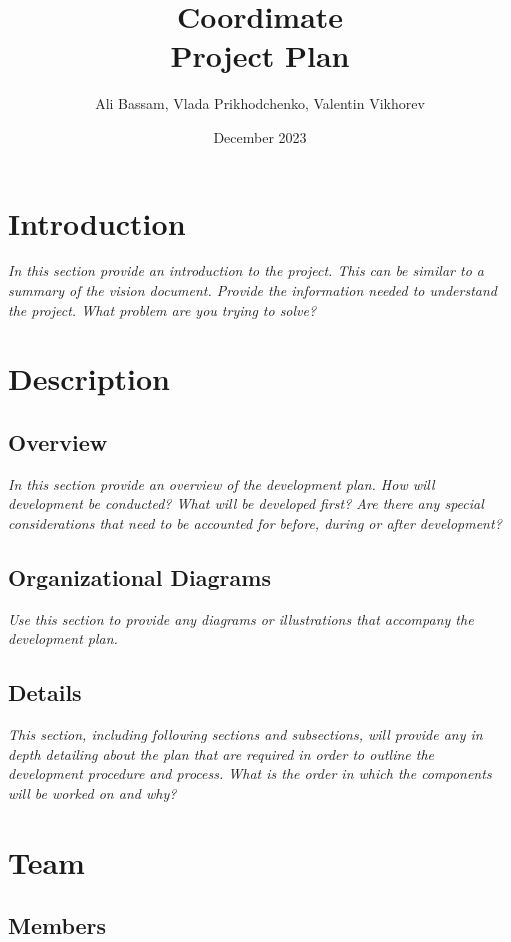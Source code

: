 \documentclass{article}
\title{Coordimate\\Project Plan}
\date{December 2023}
\author{Ali Bassam, Vlada Prikhodchenko, Valentin Vikhorev}
\begin{document}
\maketitle

\section{Introduction}

\textit{In this section provide an introduction to the project. This can be similar to
a summary of the vision document. Provide the information needed to understand
the project. What problem are you trying to solve?}

\section{Description}

\subsection{Overview}

\textit{In this section provide an overview of the development plan. How will
development be conducted? What will be developed first? Are there any special
considerations that need to be accounted for before, during or after
development?}

\subsection{Organizational Diagrams}

\textit{Use this section to provide any diagrams or illustrations that accompany the
development plan.}

\subsection{Details}

\textit{This section, including following sections and subsections, will provide any
in depth detailing about the plan that are required in order to outline the
development procedure and process. What is the order in which the components
will be worked on and why?}

\section{Team}

\subsection{Members}
\end{document}
